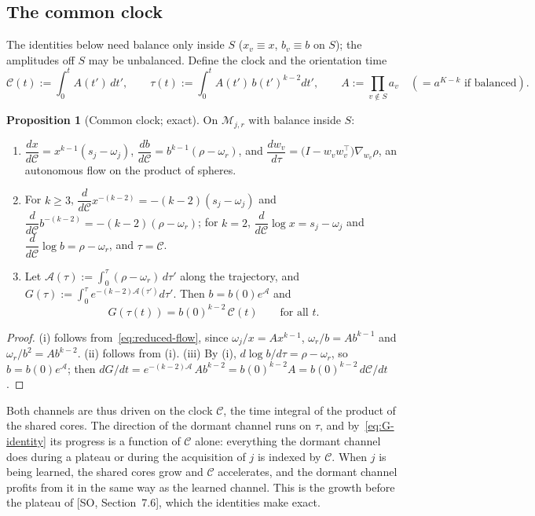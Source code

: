 \documentclass[11pt]{article}
\newcommand{\SO}{\textsf{SO}}
\newcommand{\so}[1]{[\SO, #1]}
\newcommand{\Clk}{\mathcal{C}}
\theoremstyle{definition}
\newtheorem{proposition}[theorem]{Proposition}
\numberwithin{equation}{section}
\begin{document}
\subsection{The common clock}

The identities below need balance only inside $S$ ($x_v\equiv x$, $b_v\equiv b$ on $S$); the amplitudes off $S$ may be unbalanced. Define the clock and the orientation time
\begin{equation}\label{eq:clocks}
\Clk(t):=\int_0^tA(t')\,dt',\qquad\tau(t):=\int_0^tA(t')\,b(t')^{k-2}dt',\qquad A:=\prod_{v\notin S}a_v\quad(=a^{K-k}\text{ if balanced}).
\end{equation}

\begin{proposition}[Common clock; exact]\label{prop:clock}
On $\mathcal M_{j,r}$ with balance inside $S$:
\begin{enumerate}[label=(\roman*),nosep]
\item $\dfrac{dx}{d\Clk}=x^{k-1}(s_j-\omega_j)$, $\dfrac{db}{d\Clk}=b^{k-1}(\rho-\omega_r)$, and $\dfrac{dw_v}{d\tau}=\big(I-w_vw_v^\top\big)\nabla_{w_v}\rho$, an autonomous flow on the product of spheres.
\item For $k\ge3$, $\dfrac{d}{d\Clk}x^{-(k-2)}=-(k-2)(s_j-\omega_j)$ and $\dfrac{d}{d\Clk}b^{-(k-2)}=-(k-2)(\rho-\omega_r)$; for $k=2$, $\dfrac{d}{d\Clk}\log x=s_j-\omega_j$ and $\dfrac{d}{d\Clk}\log b=\rho-\omega_r$, and $\tau=\Clk$.
\item Let $\mathcal A(\tau):=\int_0^\tau(\rho-\omega_r)\,d\tau'$ along the trajectory, and $G(\tau):=\int_0^\tau e^{-(k-2)\mathcal A(\tau')}d\tau'$. Then $b=b(0)e^{\mathcal A}$ and
\begin{equation}\label{eq:G-identity}
G(\tau(t))=b(0)^{k-2}\,\Clk(t)\qquad\text{for all }t.
\end{equation}
\end{enumerate}
\end{proposition}

\begin{proof}
(i) follows from~\eqref{eq:reduced-flow}, since $\omega_j/x=Ax^{k-1}$, $\omega_r/b=Ab^{k-1}$ and $\omega_r/b^2=Ab^{k-2}$. (ii) follows from (i). (iii) By (i), $d\log b/d\tau=\rho-\omega_r$, so $b=b(0)e^{\mathcal A}$; then $dG/dt=e^{-(k-2)\mathcal A}\,Ab^{k-2}=b(0)^{k-2}A=b(0)^{k-2}\,d\Clk/dt$.
\end{proof}

Both channels are thus driven on the clock $\Clk$, the time integral of the product of the shared cores. The direction of the dormant channel runs on $\tau$, and by~\eqref{eq:G-identity} its progress is a function of $\Clk$ alone: everything the dormant channel does during a plateau or during the acquisition of $j$ is indexed by $\Clk$. When $j$ is being learned, the shared cores grow and $\Clk$ accelerates, and the dormant channel profits from it in the same way as the learned channel. This is the growth before the plateau of \so{Section~7.6}, which the identities make exact.
\end{document}
